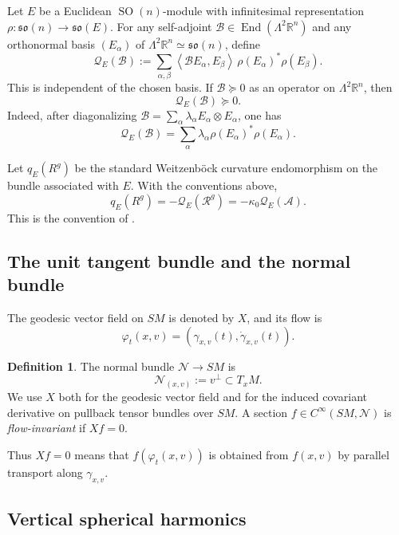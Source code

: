 \documentclass[reqno,11pt]{amsart}
\theoremstyle{definition}
\newtheorem{definition}[theorem]{Definition}
\newcommand{\SM}{SM}
\newcommand{\cN}{\mathcal N}
\newcommand{\Rop}{\mathscr R}
\newcommand{\cA}{\mathcal A}
\newcommand{\cB}{\mathcal B}
\newcommand{\cQ}{\mathcal Q}
\newcommand{\End}{\operatorname{End}}
\newcommand{\SO}{\operatorname{SO}}
\newcommand{\bbR}{\mathbb R}
\newcommand{\inner}[2]{\left\langle #1,#2\right\rangle}
\begin{document}
Let $E$ be a Euclidean $\SO(n)$-module with infinitesimal representation
\(
  \rho:\mathfrak{so}(n)\to\mathfrak{so}(E).
\)
For any self-adjoint $\cB\in\End(\Lambda^2\bbR^n)$ and any orthonormal basis
$(E_\alpha)$ of $\Lambda^2\bbR^n\simeq\mathfrak{so}(n)$, define
\begin{equation*}
  \cQ_E(\cB)
  :=\sum_{\alpha,\beta}
  \inner{\cB E_\alpha}{E_\beta}\,
  \rho(E_\alpha)^*\rho(E_\beta).
\end{equation*}
This is independent of the chosen basis. If $\cB\succeq0$ as an operator on
$\Lambda^2\bbR^n$, then
\begin{equation}\label{eq:Qpositive}
  \cQ_E(\cB)\succeq0.
\end{equation}
Indeed, after diagonalizing
$\cB=\sum_\alpha\lambda_\alpha E_\alpha\otimes E_\alpha$, one has
$$
  \cQ_E(\cB)
  =\sum_\alpha\lambda_\alpha
  \rho(E_\alpha)^*\rho(E_\alpha).
$$

Let $q_E(R^g)$ be the standard Weitzenb\"ock curvature endomorphism on the
bundle associated with $E$. With the conventions above,
\begin{equation}\label{eq:q-Q-exact-convention}
  q_E(R^g)=-\cQ_E(\Rop^g)
  =-\kappa_0\cQ_E(\cA).
\end{equation}
This is the convention of \cite[Section~3]{CLMSW25}.

\subsection{The unit tangent bundle and the normal bundle}

The geodesic vector field on $\SM$ is denoted by $X$, and its flow is
$$
  \varphi_t(x,v)
  =(\gamma_{x,v}(t),\dot\gamma_{x,v}(t)).
$$

\begin{definition}
The normal bundle $\cN\to\SM$ is
$$
  \cN_{(x,v)}:=v^\perp\subset T_xM.
$$
We use $X$ both for the geodesic vector field and for the induced covariant
derivative on pullback tensor bundles over $\SM$.
A section $f\in C^\infty(\SM,\cN)$ is \emph{flow-invariant} if $Xf=0$.
\end{definition}

Thus $Xf=0$ means that $f(\varphi_t(x,v))$ is obtained from $f(x,v)$ by
parallel transport along $\gamma_{x,v}$.

\subsection{Vertical spherical harmonics}
\end{document}
